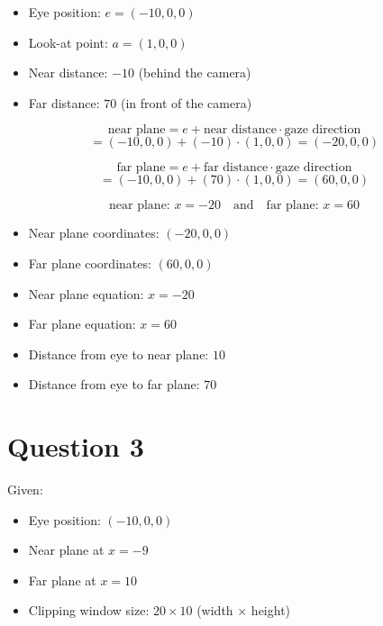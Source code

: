 \documentclass[12pt]{article}
\begin{document}
\begin{itemize}
    \item Eye position: $e = (-10, 0, 0)$
    \item Look-at point: $a = (1, 0, 0)$
    \item Near distance: $-10$ (behind the camera)
    \item Far distance: $70$ (in front of the camera)
\end{itemize}

\[
\text{near plane} = e + \text{near distance} \cdot \text{gaze direction} 
\]
\[
= (-10, 0, 0) + (-10) \cdot (1, 0, 0) = (-20, 0, 0)
\]

\bigskip
{}
\[
\text{far plane} = e + \text{far distance} \cdot \text{gaze direction} 
\]
\[
= (-10, 0, 0) + (70) \cdot (1, 0, 0) = (60, 0, 0)
\]

\bigskip
{}
\[
\text{near plane: } x = -20 \quad \text{and} \quad \text{far plane: } x = 60
\]

\bigskip
{}
\medskip
{}
\begin{itemize}
    \item Near plane coordinates: $(-20, 0, 0)$
    \item Far plane coordinates: $(60, 0, 0)$
    \item Near plane equation: $x = -20$
    \item Far plane equation: $x = 60$
    \item Distance from eye to near plane: $10$
    \item Distance from eye to far plane: $70$
\end{itemize}

\bigskip
{}

\section*{Question 3}
Given:
\begin{itemize}
  \item Eye position: $(-10, 0, 0)$
  \item Near plane at $x = -9$
  \item Far plane at $x = 10$
  \item Clipping window size: $20 \times 10$ (width $\times$ height)
\end{itemize}
\end{document}
